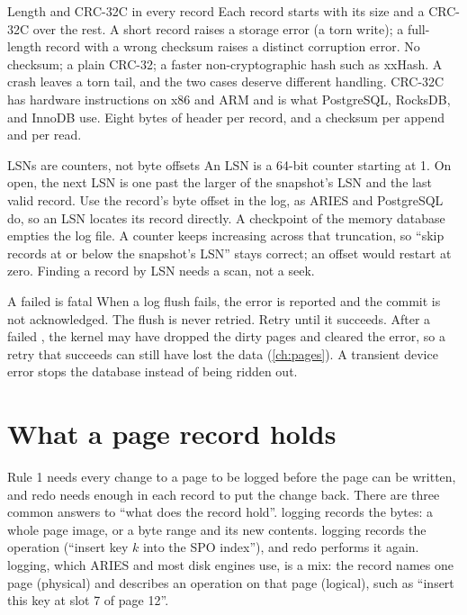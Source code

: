 \begin{decision}{Length and CRC-32C in every record}
 Each record starts with its size and a CRC-32C over the rest. A
short record raises a storage error (a torn write); a full-length record with a
wrong checksum raises a distinct corruption error.
 No checksum; a plain CRC-32; a faster non-cryptographic
hash such as xxHash.
 A crash leaves a torn tail, and the two cases deserve different
handling. CRC-32C has hardware instructions on x86 and ARM and is what
PostgreSQL, RocksDB, and InnoDB use.
 Eight bytes of header per record, and a checksum per append and per
read.
\end{decision}

\begin{decision}{LSNs are counters, not byte offsets}
 An LSN is a 64-bit counter starting at 1. On open, the next LSN
is one past the larger of the snapshot's LSN and the last valid record.
 Use the record's byte offset in the log, as ARIES and
PostgreSQL do, so an LSN locates its record directly.
 A checkpoint of the memory database empties the log file. A counter
keeps increasing across that truncation, so ``skip records at or below the
snapshot's LSN'' stays correct; an offset would restart at zero.
 Finding a record by LSN needs a scan, not a seek.
\end{decision}

\begin{decision}{A failed  is fatal}
 When a log flush fails, the error is reported and the commit is
not acknowledged. The flush is never retried.
 Retry until it succeeds.
 After a failed , the kernel may have dropped the dirty
pages and cleared the error, so a retry that succeeds can still have lost the
data (\cref{ch:pages}).
 A transient device error stops the database instead of being
ridden out.
\end{decision}

\section{What a page record holds}

Rule 1 needs every change to a page to be logged before the page can be
written, and redo needs enough in each record to put the change back. There
are three common answers to ``what does the record hold''. 
logging records the bytes: a whole page image, or a byte range and its new
contents.  logging records the operation (``insert key $k$
into the SPO index''), and redo performs it again. 
logging, which ARIES and most disk engines use, is a mix: the record names one
page (physical) and describes an operation on that page (logical), such as
``insert this key at slot 7 of page 12''.

